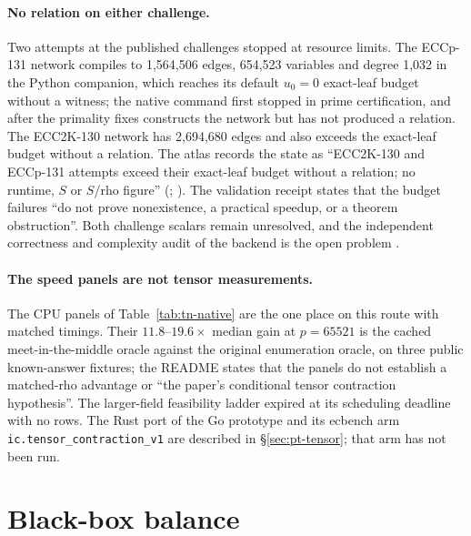 \paragraph{No relation on either challenge.} Two attempts at the published
challenges stopped at resource limits. The ECCp-131 network compiles to
1{,}564{,}506 edges, 654{,}523 variables and degree 1{,}032 in the Python
companion, which reaches its default $u_0=0$ exact-leaf budget without a
witness; the native command first stopped in prime certification, and after
the primality fixes constructs the network but has not produced a
relation. The ECC2K-130 network has 2{,}694{,}680 edges and also exceeds the
exact-leaf budget without a relation. The atlas records the state as
``ECC2K-130 and ECCp-131 attempts exceed their exact-leaf budget without a
relation; no runtime, $S$ or $S$/rho figure''
(;
). The validation receipt states that the budget
failures ``do not prove nonexistence, a practical speedup, or a theorem
obstruction''. Both challenge scalars remain unresolved, and the
independent correctness and complexity audit of the backend is the open
problem .

\paragraph{The speed panels are not tensor measurements.} The CPU panels of
Table~\ref{tab:tn-native} are the one place on this route with matched
timings. Their $11.8$--$19.6\times$ median gain at $p=65521$ is the cached
meet-in-the-middle oracle against the original enumeration oracle, on
three public known-answer fixtures; the README states that the panels do not
establish a matched-rho advantage or ``the paper's conditional tensor
contraction hypothesis''. The larger-field feasibility ladder expired at its
scheduling deadline with no rows. The Rust port of the Go prototype and its
ecbench arm \texttt{ic.tensor\_contraction\_v1} are described in
\S\ref{sec:pt-tensor}; that arm has not been run.

\section{Black-box balance}\label{sec:tn-balance}

